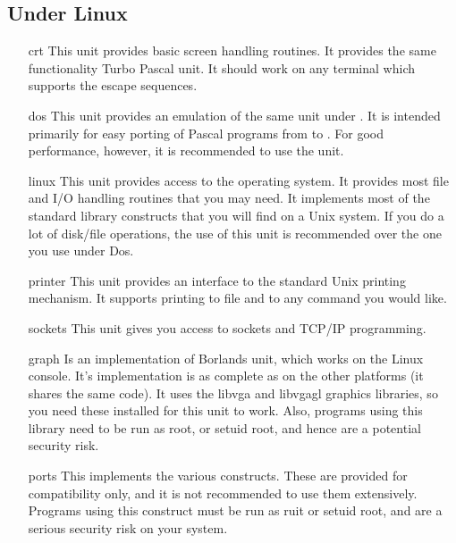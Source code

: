 \documentclass{report}
\begin{document}
\subsection{Under Linux}
\begin{itemize}
\item [crt] This unit provides basic screen handling routines.
It provides the same functionality Turbo Pascal  unit.
It should work on any terminal which supports the  escape
sequences.
\item [dos] This unit provides an emulation of the same unit under \dos.
It is intended primarily for easy porting of Pascal programs from \dos
to \linux. For good performance, however, it is recommended to use the
 unit.
\item [linux] This unit provides access to the
\linux operating system. It provides most file and I/O handling routines
that you may need. It implements most of the standard  library constructs
that you will find on a Unix system. If you do a lot of disk/file
operations, the use of this unit is recommended over the one you use under
Dos.
\item [printer] This unit provides an interface to the standard Unix
printing mechanism. It supports printing to file and to any command you
would like.
\item [sockets] This unit gives you access to sockets and TCP/IP
programming.
\item [graph] Is an implementation of Borlands  unit, which
works on the Linux console. It's implementation is as complete as on
the other platforms (it shares the same code).
It uses the libvga and libvgagl graphics libraries, so you need these
installed for this unit to work. Also, programs using this library need
to be run as root, or setuid root, and hence are a potential security risk.
\item [ports] This implements the various  constructs. These are
provided for compatibility only, and it is not recommended to use them
extensively. Programs using this construct must be run as ruit or setuid
root, and are a serious security risk on your system.
\end{itemize}
\end{document}
